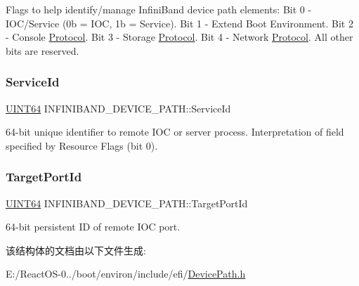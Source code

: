 Flags to help identify/manage Infini\+Band device path elements\+: Bit 0 -\/ I\+O\+C/\+Service (0b = I\+OC, 1b = Service). Bit 1 -\/ Extend Boot Environment. Bit 2 -\/ Console \hyperlink{struct_protocol}{Protocol}. Bit 3 -\/ Storage \hyperlink{struct_protocol}{Protocol}. Bit 4 -\/ Network \hyperlink{struct_protocol}{Protocol}. All other bits are reserved. \mbox{\label{struct_i_n_f_i_n_i_b_a_n_d___d_e_v_i_c_e___p_a_t_h_af1758fc49b91d39c1ea8d9447ec72095}} 
\subsubsection{\texorpdfstring{Service\+Id}{ServiceId}}
{\footnotesize\ttfamily \hyperlink{_processor_bind_8h_a57be03562867144161c1bfee95ca8f7c}{U\+I\+N\+T64} I\+N\+F\+I\+N\+I\+B\+A\+N\+D\+\_\+\+D\+E\+V\+I\+C\+E\+\_\+\+P\+A\+T\+H\+::\+Service\+Id}

64-\/bit unique identifier to remote I\+OC or server process. Interpretation of field specified by Resource Flags (bit 0). \mbox{\label{struct_i_n_f_i_n_i_b_a_n_d___d_e_v_i_c_e___p_a_t_h_a2f3db3ceab40e3bb2fee37e06ce9a0b8}} 
\subsubsection{\texorpdfstring{Target\+Port\+Id}{TargetPortId}}
{\footnotesize\ttfamily \hyperlink{_processor_bind_8h_a57be03562867144161c1bfee95ca8f7c}{U\+I\+N\+T64} I\+N\+F\+I\+N\+I\+B\+A\+N\+D\+\_\+\+D\+E\+V\+I\+C\+E\+\_\+\+P\+A\+T\+H\+::\+Target\+Port\+Id}

64-\/bit persistent ID of remote I\+OC port. 

该结构体的文档由以下文件生成\+:\begin{DoxyCompactItemize}
\item 
E\+:/\+React\+O\+S-\/0../boot/environ/include/efi/\hyperlink{_device_path_8h}{Device\+Path.\+h}\end{DoxyCompactItemize}
